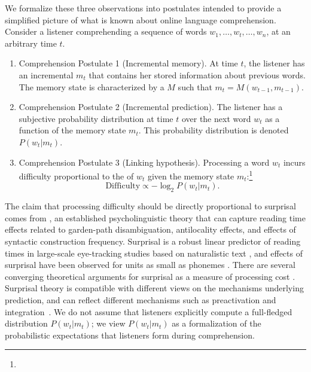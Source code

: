 We formalize these three observations into postulates intended to provide a simplified picture of what is known about online language comprehension. Consider a listener comprehending a sequence of words $w_1, \dots, w_t, \dots, w_n$, at an arbitrary time $t$.
\begin{enumerate}
    \item Comprehension Postulate 1 (Incremental memory). At time $t$, the listener has an incremental  $m_t$ that contains her stored information about previous words. The memory state is characterized by a  $M$ such that $m_t = M(w_{t-1}, m_{t-1})$.
    \item Comprehension Postulate 2 (Incremental prediction). The listener has a subjective probability distribution at time $t$ over the next word $w_t$ as a function of the memory state $m_t$. This probability distribution is denoted $P(w_t|m_t)$.
    \item Comprehension Postulate 3 (Linking hypothesis). Processing a word $w_t$ incurs difficulty proportional to the  of $w_t$ given the memory state $m_t$:\footnote{}
    \begin{equation}
    \label{eq:lossy-surp}
    \text{Difficulty} \propto -\log_2 P(w_t | m_t).
\end{equation}
\end{enumerate}
The claim that processing difficulty should be directly proportional to surprisal comes from  \citep{hale2001probabilistic,levy2008expectation}, an established psycholinguistic theory that can capture reading time effects related to garden-path disambiguation, antilocality effects, and effects of syntactic construction frequency. Surprisal is a robust linear predictor of reading times in large-scale eye-tracking studies based on naturalistic text \citep{smith2013effect,goodkind-predictive-2018,frank2019interaction,aurnhammer2019evaluating,wilcox2020predictive}, and effects of surprisal have been observed for units as small as phonemes \citep{gwilliams2020neural}. There are several converging theoretical arguments for surprisal as a measure of processing cost \citep{levy2008expectation,smith2013effect}.
Surprisal theory is compatible with different views on the mechanisms underlying prediction, and can reflect different mechanisms such as preactivation and integration~\citep{kuperberg2016we}.
We do not assume that listeners explicitly compute a full-fledged distribution $P(w_t|m_t)$; we view $P(w_t|m_t)$ as a formalization of the probabilistic expectations that listeners form during comprehension.

